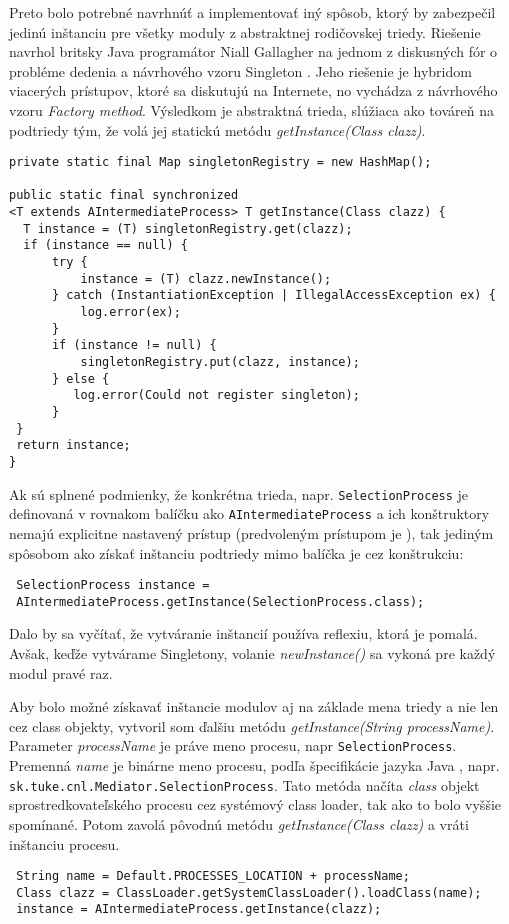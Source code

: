 Preto bolo potrebné navrhnúť a implementovať iný spôsob, ktorý by zabezpečil jedinú inštanciu pre všetky 
moduly z abstraktnej rodičovskej triedy. Riešenie navrhol britsky Java programátor Niall Gallagher
na jednom z diskusných fór o probléme dedenia a návrhového vzoru Singleton \citep{gallagher}.
Jeho riešenie je hybridom viacerých prístupov, ktoré sa diskutujú na Internete, no vychádza z 
návrhového vzoru \emph{Factory method}. Výsledkom je abstraktná trieda, slúžiaca ako továreň na 
podtriedy tým, že volá jej statickú metódu \emph{getInstance(Class clazz)}. 
\begin{verbatim}
private static final Map singletonRegistry = new HashMap();

public static final synchronized 
<T extends AIntermediateProcess> T getInstance(Class clazz) {
  T instance = (T) singletonRegistry.get(clazz);
  if (instance == null) {
      try {
          instance = (T) clazz.newInstance();
      } catch (InstantiationException | IllegalAccessException ex) {
          log.error(ex);
      }
      if (instance != null) {
          singletonRegistry.put(clazz, instance);
      } else {
         log.error(Could not register singleton);
      }
 }
 return instance;
}
\end{verbatim}
Ak sú splnené podmienky, že konkrétna trieda, napr. \verb|SelectionProcess| je definovaná v rovnakom 
balíčku ako \verb|AIntermediateProcess| a ich konštruktory nemajú explicitne nastavený prístup 
(predvoleným prístupom je ), tak 
jediným spôsobom ako získať inštanciu podtriedy mimo balíčka je cez konštrukciu:
\begin{verbatim}
 SelectionProcess instance = 
 AIntermediateProcess.getInstance(SelectionProcess.class);
\end{verbatim}
Dalo by sa vyčítať, že vytváranie inštancií používa reflexiu, ktorá je pomalá. Avšak, keďže vytvárame 
Singletony, volanie \emph{newInstance()} sa vykoná pre každý modul pravé raz.

Aby bolo možné získavať inštancie modulov aj na základe mena triedy a nie len cez class objekty, vytvoril 
som ďalšiu metódu \emph{getInstance(String processName)}. Parameter \emph{processName} je práve meno 
procesu, napr \verb|SelectionProcess|. 
Premenná \emph{name} je binárne meno procesu, podľa špecifikácie jazyka Java \citep{java_spec},
napr. \verb|sk.tuke.cnl.Mediator.SelectionProcess|.
Tato metóda načíta \emph{class} objekt sprostredkovateľského procesu cez systémový class loader,
tak ako to bolo vyššie spomínané. Potom zavolá pôvodnú metódu \emph{getInstance(Class clazz)} a 
vráti inštanciu procesu.
\begin{verbatim}
 String name = Default.PROCESSES_LOCATION + processName;
 Class clazz = ClassLoader.getSystemClassLoader().loadClass(name);
 instance = AIntermediateProcess.getInstance(clazz);
\end{verbatim}



